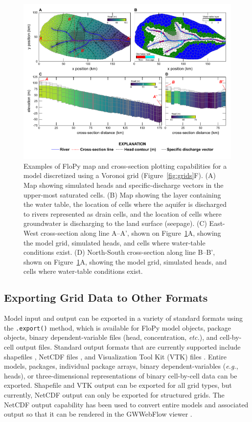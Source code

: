\documentclass[12pt, oneside]{article}  	%
\begin{document}
\begin{figure}[ht!]
	\begin{center}
		\includegraphics{figure3.pdf}
	\end{center}
	\caption{Examples of FloPy map and cross-section plotting capabilities for a model discretized using a Voronoi grid (Figure~\ref{fig:grids}F). (A) Map showing simulated heads and specific-discharge vectors in the upper-most saturated cells. (B) Map showing the layer containing the water table, the location of cells where the aquifer is discharged to rivers represented as drain cells, and the location of cells where groundwater is discharging to the land surface (seepage). (C) East-West cross-section along line A--A', shown on Figure~\ref{fig:flopyplots}A, showing the model grid, simulated heads, and cells where water-table conditions exist. (D) North-South cross-section along line B--B', shown on Figure~\ref{fig:flopyplots}A, showing the model grid, simulated heads, and cells where water-table conditions exist.}
	\label{fig:flopyplots}
\end{figure}

\subsection*{Exporting Grid Data to Other Formats}

Model input and output can be exported in a variety of standard formats using the \texttt{.export()} method, which is available for FloPy model objects, package objects, binary dependent-variable files (head, concentration, \textit{etc.}), and cell-by-cell output files. Standard output formats that are currently supported include shapefiles \citep{environmental1998esri}, NetCDF files \citep{rew2006netcdf, rew1990netcdf}, and Visualization Tool Kit (VTK) files \citep{schroeder:2006:VTK}. Entire models, packages, individual package arrays, binary dependent-variables (\textit{e.g.}, heads), or three-dimensional representations of binary cell-by-cell data can be exported. Shapefile and VTK output can be exported for all grid types, but currently, NetCDF output can only be exported for structured grids. The NetCDF output capability has been used to convert entire models and associated output so that it can be rendered in the GWWebFlow viewer \citep{gswebflow2018}.
\end{document}

